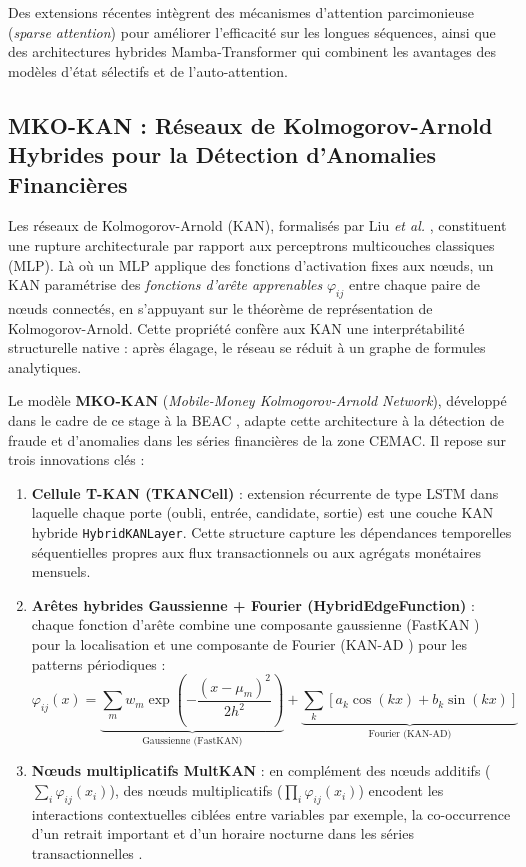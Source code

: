 \documentclass[12pt, a4paper]{article}
\begin{document}
Des extensions récentes intègrent des mécanismes d'attention parcimonieuse
(\textit{sparse attention}) pour améliorer l'efficacité sur les longues
séquences, ainsi que des architectures hybrides Mamba-Transformer
\cite{mamba2025} qui combinent les avantages des modèles d'état sélectifs
et de l'auto-attention.


\subsection{MKO-KAN : Réseaux de Kolmogorov-Arnold Hybrides pour la Détection
d'Anomalies Financières}

Les réseaux de Kolmogorov-Arnold (KAN), formalisés par Liu \textit{et al.}
\cite{liu2024kan}, constituent une rupture architecturale par rapport aux
perceptrons multicouches classiques (MLP). Là où un MLP applique des fonctions
d'activation fixes aux nœuds, un KAN paramétrise des \textit{fonctions d'arête
apprenables} $\varphi_{ij}$ entre chaque paire de nœuds connectés, en
s'appuyant sur le théorème de représentation de Kolmogorov-Arnold. Cette
propriété confère aux KAN une interprétabilité structurelle native : après
élagage, le réseau se réduit à un graphe de formules analytiques.

Le modèle \textbf{MKO-KAN} (\textit{Mobile-Money Kolmogorov-Arnold Network}),
développé dans le cadre de ce stage à la BEAC \cite{moukoko2025mkan}, adapte
cette architecture à la détection de fraude et d'anomalies dans les séries
financières de la zone CEMAC. Il repose sur trois innovations clés :

\begin{enumerate}
    \item \textbf{Cellule T-KAN (TKANCell)} : extension récurrente de type LSTM
    dans laquelle chaque porte (oubli, entrée, candidate, sortie) est une couche
    KAN hybride \texttt{HybridKANLayer}. Cette structure capture les dépendances
    temporelles séquentielles propres aux flux transactionnels ou aux agrégats
    monétaires mensuels.

    \item \textbf{Arêtes hybrides Gaussienne + Fourier (HybridEdgeFunction)} :
    chaque fonction d'arête combine une composante gaussienne (FastKAN
    \cite{li2024fastkan}) pour la localisation et une composante de Fourier
    (KAN-AD \cite{zhou2024kanad}) pour les patterns périodiques :
    \[
      \varphi_{ij}(x) =
        \underbrace{\sum_{m} w_m \exp\!\left(-\frac{(x-\mu_m)^2}{2h^2}\right)}_{\text{Gaussienne (FastKAN)}}
        +
        \underbrace{\sum_{k} \left[a_k \cos(kx) + b_k \sin(kx)\right]}_{\text{Fourier (KAN-AD)}}
    \]

    \item \textbf{Nœuds multiplicatifs MultKAN} : en complément des nœuds
    additifs ($\sum_i \varphi_{ij}(x_i)$), des nœuds multiplicatifs
    ($\prod_i \varphi_{ij}(x_i)$) encodent les interactions contextuelles
    ciblées entre variables  par exemple, la co-occurrence d'un retrait
    important et d'un horaire nocturne dans les séries transactionnelles
    \cite{yanglu2024kan}.
\end{enumerate}
\end{document}

